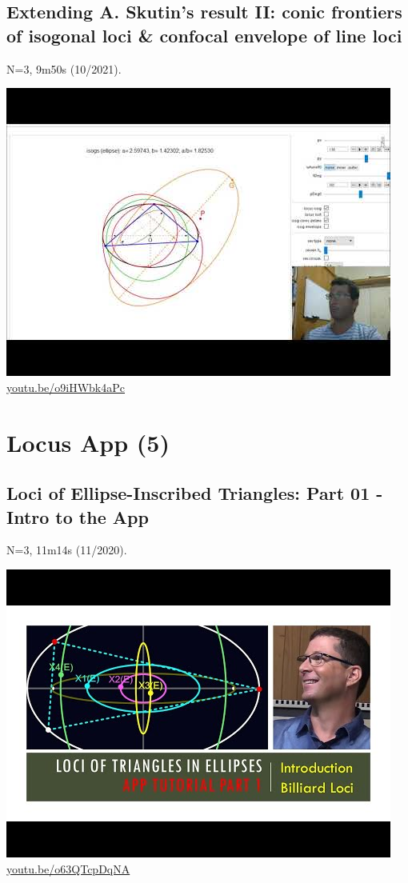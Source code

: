 \documentclass[12pt]{amsart}
\begin{document}
\subsection{Extending A. Skutin's result II: conic frontiers of isogonal loci \& confocal envelope of line loci}
\label{vid:o9iHWbk4aPc}
\noindent N=3, 9m50s (10/2021). 
\begin{center}\includegraphics[width=.5\textwidth]{pics/o9iHWbk4aPc.jpg} \\ 
\href{https://youtu.be/o9iHWbk4aPc}{\url{youtu.be/o9iHWbk4aPc}}\end{center}
% 

\section{Locus App (5)}

\subsection{Loci of Ellipse-Inscribed Triangles: Part 01 - Intro to the App}
\label{vid:o63QTcpDqNA}
\noindent N=3, 11m14s (11/2020). 
\begin{center}\includegraphics[width=.5\textwidth]{pics/o63QTcpDqNA.jpg} \\ 
\href{https://youtu.be/o63QTcpDqNA}{\url{youtu.be/o63QTcpDqNA}}\end{center}
% 
\end{document}
